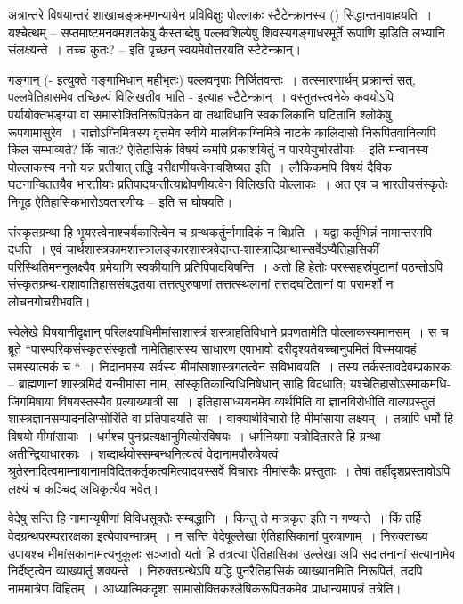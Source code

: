अत्रान्तरे विषयान्तरं शाखाचङ्क्रमणन्यायेन प्रविविक्षुः पोल्लाकः स्टैटेन्क्रानस्य () सिद्धान्तमावाहयति~। यश्चेत्थम् – सप्तमाष्टमनवमशतकेषु कैस्ताब्देषु पल्लवशिल्पेषु शिवस्य\break गङ्गाधरमूर्ते रूपाणि झडिति लभ्यानि संलक्ष्यन्ते~। तच्च कुतः? – इति पृच्छन् स्वयमेवोत्तरयति स्टैटेन्क्रान्।

गङ्गान् (- इत्युक्ते गङ्गाभिधान् महीभृतः) पल्लवनृपाः निर्जितवन्तः~। तत्स्मारणार्थम् प्रक्रान्तं सत्, पल्लवेतिहासमेव तच्छिल्पं विलिखतीव भाति - इत्याह स्टैटेन्क्रान्~। वस्तुतस्त्वनेके कवयोऽपि पर्यायोक्तभङ्ग्या वा समासोक्तिनिरूपितकेन वा तथाविधानि स्वकालिकानि घटितानि श्लोकेषु रूपयामासुरेव~। राज्ञोऽग्निमित्रस्य वृत्तमेव स्वीये मालविकाग्निमित्रे नाटके कालिदासो निरूपितवानित्यपि किल सम्भाव्यते? किं चातः? ऐतिहासिकं विषयं कमपि प्रकाशयितुं न पारयेयुर्भारतीयाः – इति मन्वानस्य पोल्लाकस्य मनो यन्न प्रतीयात् तद्धि परीक्षणीयत्वेनावशिष्यत इति~। लौकिकमपि विषयं दैविक घटनान्विततयैव भारतीयाः प्रतिपादयन्तीत्याक्षेपणीयत्वेन विलिखति पोल्लाकः~। अत एव च भारतीयसंस्कृतेः निगूढ ऐतिहासिकभारोऽवतारणीयः – इति स घोषयति।

संस्कृतग्रन्था हि भूयस्त्वेनाश्चर्यकारित्वेन च ग्रन्थकर्तुर्नामादिकं न बिभ्रति~। यद्वा कर्तृभिन्नं नामान्तरमपि दधति~। एवं चार्थशास्त्रकामशास्त्रालङ्कारशास्त्रवेदान्त-शास्त्रादिग्रन्थास्सर्वेऽप्यैतिहासिकीं परिस्थितिमननुलक्ष्यैव प्रमेयाणि स्वकीयानि प्रतिपिपादयिषन्ति~। अतो हि हेतोः परस्सहस्रं\break पुटानां पठन्तोऽपि संस्कृतग्रन्थ-राशावातिहाससंबद्धतया तत्तत्पुरुषाणां तत्तत्स्थलानां तत्तद्घटितानां वा परामर्शो न लोचनगोचरीभवति।

स्वेलेखे विषयानीदृक्षान् परिलक्ष्याधिमीमांसाशास्त्रं शस्त्राहतिविधाने प्रवणतामेति पोल्लाकस्य\break मानसम्~। स च ब्रूते “पारम्परिकसंस्कृतसंस्कृतौ नामेतिहासस्य साधारण एवाभावो दरीदृश्यते\break यच्चानुपमितं विस्मयावहं समस्यात्मकं च “~। निदानमस्य सर्वस्य मीमांसाशास्त्रगतत्वेन स\break विभावयति~। तस्य तर्कस्तावदेवम्प्रकारकः – ब्राह्मणानां शास्त्रमिदं यन्मीमांसा नाम, सांस्कृतिकान्\break विधिनिषेधान् साहि विदधाति; यश्चेतिहासोऽस्माकमधि-जिगमिषाया विषयस्तस्यैव प्रत्याख्यात्री सा~। इतिहासाध्ययनमेव व्यर्थमिति वा ज्ञानविरोधीति वात्यप्रस्तुतं शास्त्रज्ञानसम्पादनलिप्सोरिति वा प्रतिपादयति सा~। वाक्यार्थविचारो हि मीमांसाया लक्ष्यम्~। तत्रापि धर्मो हि विषयो मीमांसायाः~। धर्मश्च पुनःप्रत्यक्षानुमित्योरविषयः~। धर्मनियमा यत्रोदितास्ते हि ग्रन्था अतीन्द्रियाधारकाः~। शब्दार्थयोस्सम्बन्धनित्यत्वं वेदानामपौरुषेयत्वं श्रुतेरनादित्वमाम्नायानामविदितकर्तृकत्वमित्यादयस्सर्वे विचाराः मीमांसकैः प्रस्तुताः~। तेषां तर्हीदृशप्रस्तावोऽपि लक्ष्यं च कञ्चिद् अधिकृत्यैव भवेत्।

वेदेषु सन्ति हि नामान्यृषीणां विविधसूक्तैः सम्बद्धानि~। किन्तु ते मन्त्रकृत इति न गण्यन्ते~। किं तर्हि वेदग्रन्थपरम्परारक्षका इत्येवावन्मात्रम्~। न सन्ति वेदेषूल्लेखा ऐतिहासिकानां पुरुषाणाम्~। निरुक्ताख्य उपायश्च मीमांसकानामत्यनुकूलः सञ्जातो यतो हि तत्रत्या ऐतिहासिका उल्लेखा अपि सदातनानां सत्यानामेव निर्देष्टृत्वेन व्याख्यातुं शक्यन्ते~। निरुक्तग्रन्थेऽपि यद्धि पुनरैतिहासिकं व्याख्यानमिति निरूपितं, तदपि नाममात्रेण विहितम्~। आध्यात्मिकदृशा सामासोक्तिकश्लैषिकरूपितकमेव प्राधान्यमापन्नं तत्रेति।

